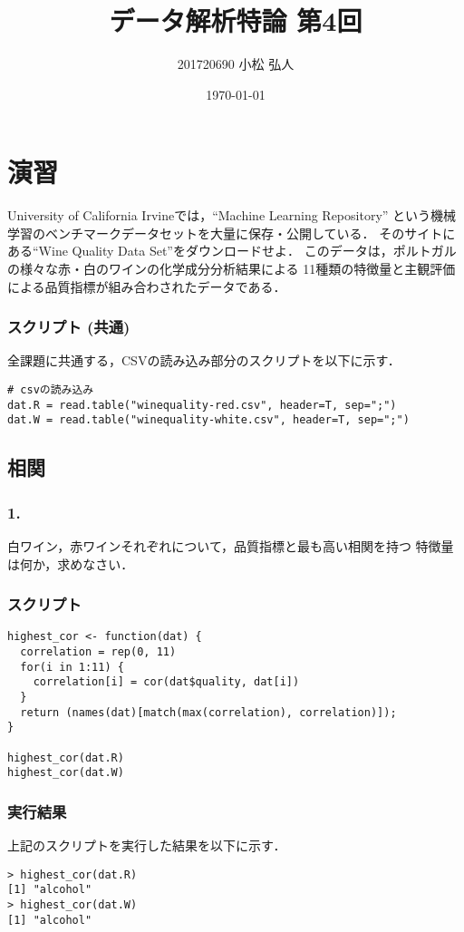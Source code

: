 \documentclass{jsarticle}
\title{データ解析特論 第4回}
\author{201720690 小松 弘人}
\date{\today}
\begin{document}
\maketitle
\thispagestyle{empty}
\section*{演習}
University of California Irvineでは，``Machine Learning Repository''
という機械学習のベンチマークデータセットを大量に保存・公開している．
そのサイトにある``Wine Quality Data Set''をダウンロードせよ．
このデータは，ポルトガルの様々な赤・白のワインの化学成分分析結果による
11種類の特徴量と主観評価による品質指標が組み合わされたデータである．

\subsubsection*{スクリプト (共通)}
全課題に共通する，CSVの読み込み部分のスクリプトを以下に示す．
\begin{lstlisting}[basicstyle=\ttfamily\footnotesize, frame=single]
# csvの読み込み
dat.R = read.table("winequality-red.csv", header=T, sep=";")
dat.W = read.table("winequality-white.csv", header=T, sep=";")
\end{lstlisting}

\subsection*{相関}
\subsubsection*{1.}
白ワイン，赤ワインそれぞれについて，品質指標と最も高い相関を持つ
特徴量は何か，求めなさい．

\subsubsection*{スクリプト}
\begin{lstlisting}[basicstyle=\ttfamily\footnotesize, frame=single]
highest_cor <- function(dat) {
  correlation = rep(0, 11)
  for(i in 1:11) {
    correlation[i] = cor(dat$quality, dat[i])
  }
  return (names(dat)[match(max(correlation), correlation)]);
}

highest_cor(dat.R)
highest_cor(dat.W)
\end{lstlisting}

\subsubsection*{実行結果}
上記のスクリプトを実行した結果を以下に示す．
\begin{verbatim}
> highest_cor(dat.R)
[1] "alcohol"
> highest_cor(dat.W)
[1] "alcohol"
\end{verbatim}
\end{document}
